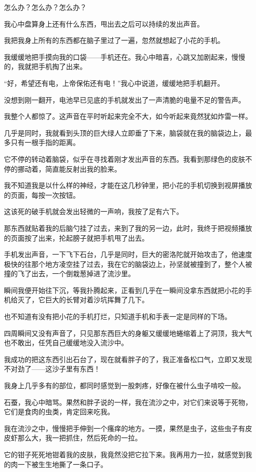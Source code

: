 怎么办？怎么办？怎么办？

我心中盘算身上还有什么东西，甩出去之后可以持续的发出声音。

我把我身上所有的东西都在脑子里过了一遍，忽然就想起了小花的手机。

我缓缓地把手摸向我的口袋——手机还在。我心中暗喜，心跳又加剧起来，慢慢的，我就把手机掏了出来。

“好，希望还有电，上帝保佑还有电！”我心中说道，缓缓地把手机翻开。

没想到刚一翻开，电池早已见底的手机就发出了一声清脆的电量不足的警告声。

我整个人都惊了。这声音在平时听起来完全不大，如今听起来竟然犹如炸雷一样。

几乎是同时，我就看到头顶的巨大绿人立即垂了下来，脑袋就在我的脑袋边上，最多只有一根手指的距离。

它不停的转动着脑袋，似乎在寻找着刚才发出声音的东西。我看到那绿色的皮肤不停的挪动着，简直能反射出我的脸来。

我不知道我是以什么样的神经，才能在这几秒钟里，把小花的手机切换到视屏播放的页面，每按一次按钮。

这该死的破手机就会发出轻微的一声响，我按了足有六下。

那东西就贴着我的后脑勺挂了过去，来到了我的另一边，此时，我终于把视频播放的页面按了出来，抡起膀子就把手机甩了出去。

手机发出声音，一下飞下石台，几乎是同时，巨大的密洛陀就开始攻击了，他速度极快的往那个地方凌空挂了过去，我在它的脑袋边上，孙坚就被撞到了，整个人被撞的飞了出去，一个倒栽葱掉进了流沙里。

瞬间我便开始往下沉，等我扑腾起来，正看到几乎在一瞬间没拿东西就把小花的手机给灭了，它巨大的长臂对着沙坑挥舞了几下。

也不知道有没有把小花的手机打烂，只知道手机和手表一定是同样的下场。

四周瞬间又没有声音了，只见那东西巨大的身躯又缓缓地蜷缩着上了洞顶，我大气也不敢出，任凭自己缓缓地没入流沙中。

我成功的把这东西引出石台了，现在就看胖子的了，我正准备松口气，立即又发现不对劲了——这沙子里有东西！

我身上几乎多有的部位，都同时感觉到一股刺疼，好像在被什么虫子啃咬一般。

石蚕，我心中暗骂。果然和胖子说的一样，我在流沙之中，对它们来说等于死物，它们是食肉的虫类，肯定回来吃我。

我在流沙之中，慢慢把手伸到一个瘙痒的地方。一摸，果然是虫子，这些虫子有皮皮虾那么大，我一把抓住，然后死命的一拉。

它的钳子死死地钳着我的皮肤，我竟然没把它拉下来。我再用力一拉，就感觉到我的肉一下被生生地撕了一条口子。

